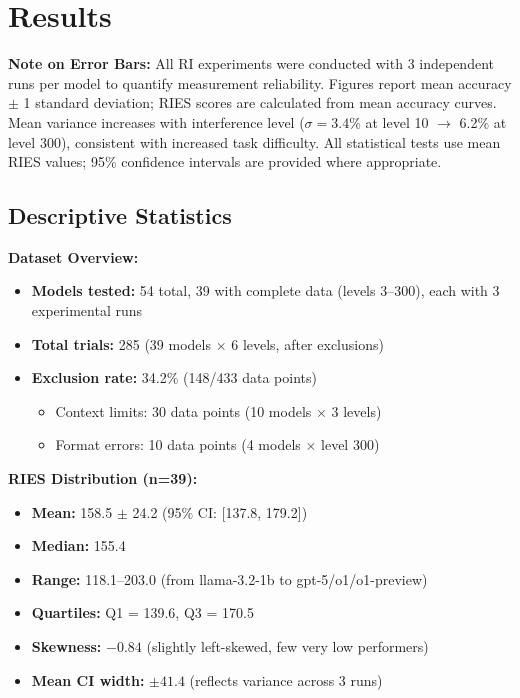 \documentclass{article}
\begin{document}
\section{Results}

\textbf{Note on Error Bars:} All RI experiments were conducted with 3 independent runs per model to quantify measurement reliability. Figures report mean accuracy $\pm$ 1 standard deviation; RIES scores are calculated from mean accuracy curves. Mean variance increases with interference level ($\sigma = 3.4\%$ at level 10 $\rightarrow$ 6.2\% at level 300), consistent with increased task difficulty. All statistical tests use mean RIES values; 95\% confidence intervals are provided where appropriate.

\subsection{Descriptive Statistics}

\textbf{Dataset Overview:}
\begin{itemize}[itemsep=2pt,topsep=3pt,parsep=0pt]
    \item \textbf{Models tested:} 54 total, 39 with complete data (levels 3--300), each with 3 experimental runs
    \item \textbf{Total trials:} 285 (39 models $\times$ 6 levels, after exclusions)
    \item \textbf{Exclusion rate:} 34.2\% (148/433 data points)
    \begin{itemize}[itemsep=2pt,topsep=3pt,parsep=0pt]
        \item Context limits: 30 data points (10 models $\times$ 3 levels)
        \item Format errors: 10 data points (4 models $\times$ level 300)
    \end{itemize}
\end{itemize}

\textbf{RIES Distribution (n=39):}
\begin{itemize}[itemsep=2pt,topsep=3pt,parsep=0pt]
    \item \textbf{Mean:} 158.5 $\pm$ 24.2 (95\% CI: [137.8, 179.2])
    \item \textbf{Median:} 155.4
    \item \textbf{Range:} 118.1--203.0 (from llama-3.2-1b to gpt-5/o1/o1-preview)
    \item \textbf{Quartiles:} Q1 = 139.6, Q3 = 170.5
    \item \textbf{Skewness:} $-0.84$ (slightly left-skewed, few very low performers)
    \item \textbf{Mean CI width:} $\pm 41.4$ (reflects variance across 3 runs)
\end{itemize}
\end{document}
